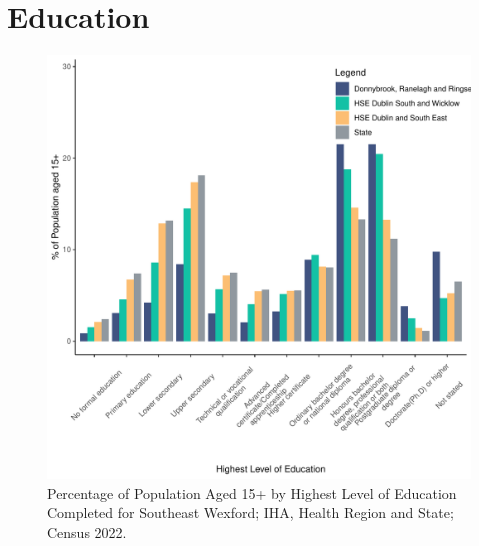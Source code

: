\documentclass{article}
\begin{document}
\section{Education}\label{sect:Edu}
\begin{figure}[H]
	\centering
	\includegraphics[width = 120mm]{../figures/EduED.pdf}
	\caption{Percentage of Population Aged 15+ by Highest Level of Education Completed for Southeast Wexford; IHA, Health Region and State; Census 2022.}
	\label{fig:vbnv}
	\end{figure}
\end{document}
